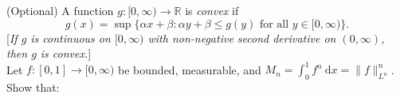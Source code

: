 \documentclass[answers]{exam}
\begin{document}
\begin{questions}
\question%
(Optional) A function $g:[0, \infty) \to \mathbb{R}$ is \emph{convex} if \[
	g(x)=\sup \{\alpha x+\beta: \alpha y+\beta \leq g(y) \text{ for all } y \in[0, \infty)\}.
\] [\emph{If $g$ is continuous on $[0, \infty)$ with non-negative second derivative on $(0, \infty)$, then $g$ is convex.}]\\ Let $f:[0,1] \to[0, \infty)$ be bounded, measurable, and $M_{n}=\int_{0}^{1} f^{n}~\mathrm d x=\|f\|_{L^{n}}^{n}$. Show that:

\end{questions}
\end{document}
